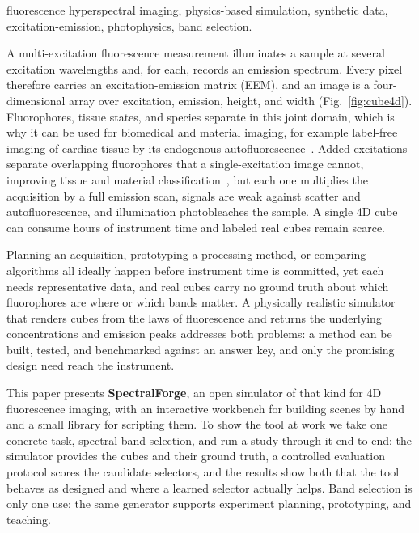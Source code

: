 \documentclass{article}
\makeatletter
\renewcommand\section{\@startsection{section}{1}{\z@}{9pt}{4pt}{\normalfont\bfseries}}
\makeatother
\begin{document}
\begin{keywords}
fluorescence hyperspectral imaging, physics-based simulation, synthetic data,
excitation-emission, photophysics, band selection.
\end{keywords}

\section{Introduction}
A multi-excitation fluorescence measurement illuminates a sample at several excitation
wavelengths and, for each, records an emission spectrum. Every pixel therefore carries an
excitation-emission matrix (EEM), and an image is a four-dimensional array over excitation,
emission, height, and width (Fig.~\ref{fig:cube4d}). Fluorophores, tissue states, and species
separate in this joint domain, which is why it can be used for biomedical and material imaging,
for example label-free imaging of cardiac tissue by its endogenous
autofluorescence~\cite{ref_mercader,ref_gil}. Added excitations separate overlapping
fluorophores that a single-excitation image cannot, improving tissue and material
classification~\cite{ref_chil4d,ref_chillichen,ref_hunanyan}, but each one multiplies the
acquisition by a full emission scan, signals are weak against scatter and autofluorescence,
and illumination photobleaches the sample. A single 4D cube can consume hours of
instrument time and labeled real cubes remain scarce.

Planning an acquisition, prototyping a processing method, or comparing algorithms all
ideally happen before instrument time is committed, yet each needs representative data, and
real cubes carry no ground truth about which fluorophores are where or which bands matter. A
physically realistic simulator that renders cubes from the laws of fluorescence and returns
the underlying concentrations and emission peaks addresses both problems: a method can be
built, tested, and benchmarked against an answer key, and only the promising design need
reach the instrument.

This paper presents \textbf{SpectralForge}, an open simulator of that kind for 4D
fluorescence imaging, with an interactive workbench for building scenes by hand and a small
library for scripting them. To show the tool at work we take one concrete task, spectral
band selection, and run a study through it end to end: the simulator provides the cubes and
their ground truth, a controlled evaluation protocol scores the candidate selectors, and
the results show both that the tool behaves as designed and where a learned selector
actually helps. Band selection is only one use; the same generator supports experiment
planning, prototyping, and teaching.
\end{document}
